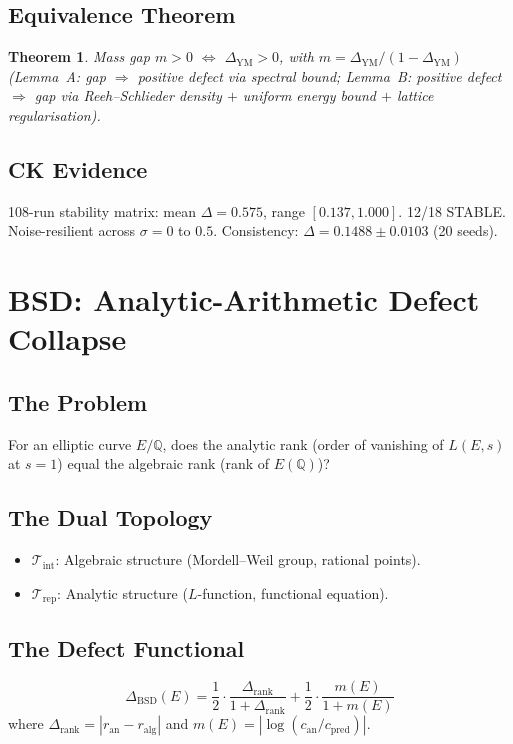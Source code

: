 \documentclass[12pt, openany]{book}
\newtheorem{theorem}{Theorem}[chapter]
\theoremstyle{remark}
\newcommand{\Q}{\mathbb{Q}}
\newcommand{\Tint}{\mathcal{T}_{\mathrm{int}}}
\newcommand{\Trep}{\mathcal{T}_{\mathrm{rep}}}
\begin{document}
\subsection{Equivalence Theorem}
\begin{theorem}
Mass gap $m > 0$ $\Longleftrightarrow$ $\Delta_{\mathrm{YM}} > 0$, with
$m = \Delta_{\mathrm{YM}} / (1 - \Delta_{\mathrm{YM}})$
(Lemma~A: gap $\Rightarrow$ positive defect via spectral bound;
Lemma~B: positive defect $\Rightarrow$ gap via Reeh--Schlieder density $+$
uniform energy bound $+$ lattice regularisation).
\end{theorem}

\subsection{CK Evidence}
108-run stability matrix: mean $\Delta = 0.575$, range $[0.137, 1.000]$.
12/18 STABLE. Noise-resilient across $\sigma = 0$ to $0.5$.
Consistency: $\Delta = 0.1488 \pm 0.0103$ (20 seeds).


\section{BSD: Analytic-Arithmetic Defect Collapse}
\label{sec:bsd}

\subsection{The Problem}
For an elliptic curve $E/\Q$, does the analytic rank (order of vanishing of $L(E,s)$
at $s = 1$) equal the algebraic rank (rank of $E(\Q)$)?

\subsection{The Dual Topology}
\begin{itemize}
  \item $\Tint$: Algebraic structure (Mordell--Weil group, rational points).
  \item $\Trep$: Analytic structure ($L$-function, functional equation).
\end{itemize}

\subsection{The Defect Functional}
\[
  \boxed{\Delta_{\mathrm{BSD}}(E) = \frac{1}{2} \cdot \frac{\Delta_{\mathrm{rank}}}{1 + \Delta_{\mathrm{rank}}} + \frac{1}{2} \cdot \frac{m(E)}{1 + m(E)}}
\]
where $\Delta_{\mathrm{rank}} = |r_{\mathrm{an}} - r_{\mathrm{alg}}|$ and
$m(E) = |\log(c_{\mathrm{an}} / c_{\mathrm{pred}})|$.
\end{document}
